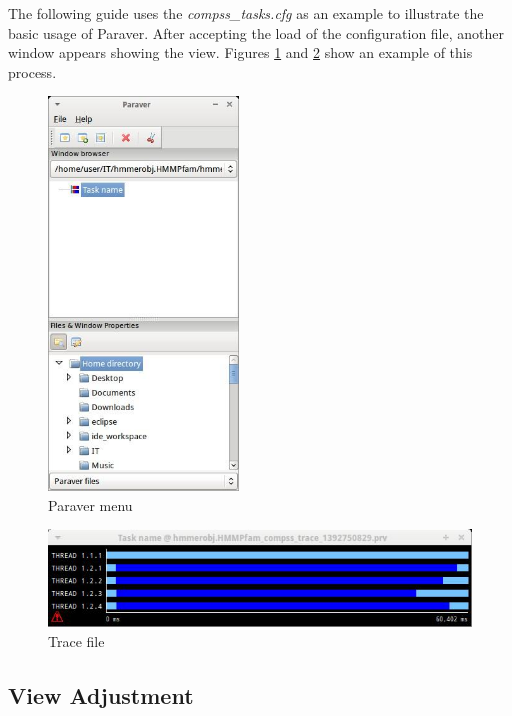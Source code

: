 The following guide uses the \textit{compss\_tasks.cfg} as an example to illustrate the basic usage of Paraver.
After accepting the load of the configuration file, another window appears showing the view. Figures \ref{fig:trace_1} and
\ref{fig:trace_2} show an example of this process.

\begin{figure}[ht!]
  \centering
    \includegraphics[width=0.45\textwidth]{./Sections/3_Visualization/Figures/1.jpeg}
    \caption{Paraver menu}
    \label{fig:trace_1}
\end{figure}

\begin{figure}[ht!]
  \centering
    \includegraphics[width=1.0\textwidth]{./Sections/3_Visualization/Figures/2.jpeg}
    \caption{Trace file}
    \label{fig:trace_2}
\end{figure}

\subsection{View Adjustment}


